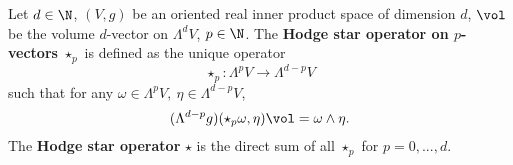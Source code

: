 \begin{definition}
  Let
    $d \in \N$,
    $(V, g)$ be an oriented real inner product space of dimension $d$,
    $\vol$ be the volume $d$-vector on $\Lambda^d V$,
    $p \in \N$.
  The \textbf{Hodge star operator on $p$-vectors} $\star_p$
  is defined as the unique operator
  \begin{equation}
    \star_p \colon \Lambda^p V \to \Lambda^{d - p} V
  \end{equation}
  such that for any $\omega \in \Lambda^p V,\ \eta \in \Lambda^{d - p} V$,
  \begin{equation}
    (\Lambda^{d - p} g)(\star_p \omega, \eta) \vol = \omega \wedge \eta.
  \end{equation}
  The \textbf{Hodge star operator} $\star$ is the direct sum of all $\star_p$
  for $p = 0, ..., d$.
\end{definition}
